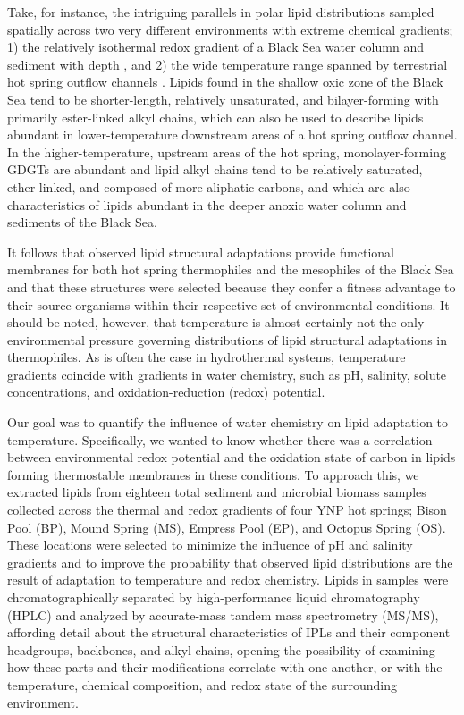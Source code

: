 Take, for instance, the intriguing parallels in polar lipid distributions sampled spatially across two very different environments with extreme chemical gradients; 1) the relatively isothermal redox gradient of a Black Sea water column and sediment with depth \citep{schubotz2009detection, schroder2015intact}, and 2) the wide temperature range spanned by terrestrial hot spring outflow channels \citep{schubotz2013spatial, schubotz2015stable}. Lipids found in the shallow oxic zone of the Black Sea tend to be shorter-length, relatively unsaturated, and bilayer-forming with primarily ester-linked alkyl chains, which can also be used to describe lipids abundant in lower-temperature downstream areas of a hot spring outflow channel. In the higher-temperature, upstream areas of the hot spring, monolayer-forming GDGTs are abundant and lipid alkyl chains tend to be relatively saturated, ether-linked, and composed of more aliphatic carbons, and which are also characteristics of lipids abundant in the deeper anoxic water column and sediments of the Black Sea. 

It follows that observed lipid structural adaptations provide functional membranes for both hot spring thermophiles and the mesophiles of the Black Sea and that these structures were selected because they confer a fitness advantage to their source organisms within their respective set of environmental conditions. It should be noted, however, that temperature is almost certainly not the only environmental pressure governing distributions of lipid structural adaptations in thermophiles. As is often the case in hydrothermal systems, temperature gradients coincide with gradients in water chemistry, such as pH, salinity, solute concentrations, and oxidation-reduction (redox) potential.

Our goal was to quantify the influence of water chemistry on lipid adaptation to temperature. Specifically, we wanted to know whether there was a correlation between environmental redox potential and the oxidation state of carbon in lipids forming thermostable membranes in these conditions. To approach this, we extracted lipids from eighteen total sediment and microbial biomass samples collected across the thermal and redox gradients of four YNP hot springs; Bison Pool (BP), Mound Spring (MS), Empress Pool (EP), and Octopus Spring (OS). These locations were selected to minimize the influence of pH and salinity gradients and to improve the probability that observed lipid distributions are the result of adaptation to temperature and redox chemistry. Lipids in samples were chromatographically separated by high-performance liquid chromatography (HPLC) and analyzed by accurate-mass tandem mass spectrometry (MS/MS), affording detail about the structural characteristics of IPLs and their component headgroups, backbones, and alkyl chains, opening the possibility of examining how these parts and their modifications correlate with one another, or with the temperature, chemical composition, and redox state of the surrounding environment.

